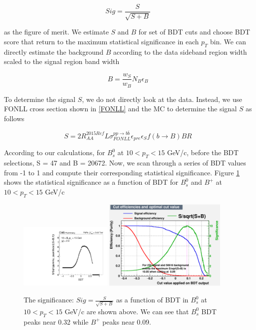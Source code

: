 \begin{equation}
Sig = \frac{S}{\sqrt{S+B}}
\end{equation}

as the figure of merit. We estimate $S$ and $B$ for set of BDT cuts and choose BDT score that return to the maximum statistical significance in each $p_T$ bin. We can directly estimate the background $B$ according to the data sideband region width scaled to the signal region band width

\begin{equation}
B = \frac{w_{S}}{w_{B}} N_{B} \epsilon_{B}
\end{equation}

To determine the signal $S$, we do not directly look at the data. Instead, we use FONLL cross section \cite{FONLLRef} shown in \ref{FONLL} and the MC to determine the signal $S$ as follows

\begin{equation}
S = 2 R_{AA}^{2015Ref} L \sigma_{FONLL}^{pp\rightarrow b\bar b} \epsilon_{pre} \epsilon_{S} f(b\rightarrow B) BR
\end{equation}

According to our calculations, for $B^0_s$ at $10 < p_T < 15$ GeV/c, before the BDT selections, S = 47 and B = 20672. Now, we scan through a series of BDT values from -1 to 1 and compute their corresponding statistical significance. Figure \ref{WorkingPoint} shows the statistical significance as a function of BDT for $B^0_s$ and $B^+$ at $10 < p_T <  15$ GeV/c

\begin{figure}[h]
\begin{center}
\includegraphics[width= 0.40\textwidth]{Figures/Chapter5/BsSig_10_15.pdf}
\includegraphics[width= 0.53\textwidth]{Figures/Chapter5/BPSig_10_15.pdf}
\caption{The significance: $Sig = \frac{S}{\sqrt{S+B}}$ as a function of BDT in $B^0_s$ at $10 < p_T <  15$ GeV/c are shown above. We can see that $B^0_s$ BDT peaks near 0.32 while $B^+$ peaks near 0.09.}
\label{WorkingPoint}
\end{center}
\end{figure}

